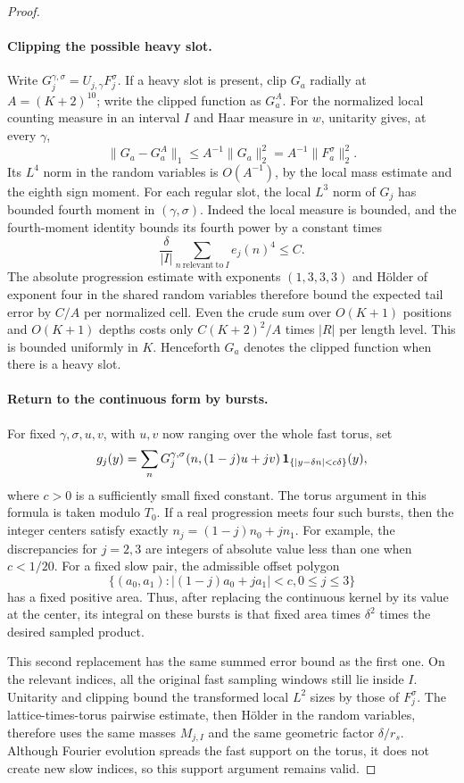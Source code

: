 \begin{proof}
\paragraph{Clipping the possible heavy slot.}
Write $G_j^{\gamma,\sigma}=U_{j,\gamma}F_j^\sigma$.
If a heavy slot is present, clip $G_a$ radially at
$A=(K+2)^{10}$; write the clipped function as $G_a^A$.
For the normalized local counting measure in an interval $I$ and
Haar measure in $w$, unitarity gives, at every $\gamma$,
\[
 \|G_a-G_a^A\|_1
 \le A^{-1}\|G_a\|_2^2
 =A^{-1}\|F_a^\sigma\|_2^2.
\]
Its $L^4$ norm in the random variables is $O(A^{-1})$, by the local
mass estimate and the eighth sign moment.  For each regular slot,
the local $L^3$ norm of $G_j$ has bounded fourth moment in
$(\gamma,\sigma)$.  Indeed the local measure is bounded, and the
fourth-moment identity bounds its fourth power by a constant times
\[
 \frac{\delta}{|I|}
       \sum_{n\ \mathrm{relevant\ to}\ I}e_j(n)^4\le C.
\]
The absolute progression estimate with exponents $(1,3,3,3)$ and
H\"older of exponent four in the shared random variables therefore
bound the expected tail error by $C/A$ per normalized cell.  Even
the crude sum over $O(K+1)$ positions and $O(K+1)$ depths costs only
$C(K+2)^2/A$ times $|R|$ per length level.  This is bounded uniformly
in $K$.  Henceforth $G_a$ denotes the clipped function when there is
a heavy slot.

\paragraph{Return to the continuous form by bursts.}
For fixed $\gamma,\sigma,u,v$, with $u,v$ now ranging over the whole
fast torus, set
\[
 g_j(y)=\sum_n G_j^{\gamma,\sigma}
                (n,(1-j)u+jv)\,
                \mathbf 1_{\{|y-\delta n|<c\delta\}}(y),
\]
where $c>0$ is a sufficiently small fixed constant.  The torus
argument in this formula is taken modulo $T_0$.  If a real progression
meets four such bursts, then the integer centers satisfy exactly
$n_j=(1-j)n_0+jn_1$.  For example, the discrepancies for $j=2,3$ are
integers of absolute value less than one when $c<1/20$.
For a fixed slow pair, the admissible offset polygon
\[
 \{(a_0,a_1): |(1-j)a_0+ja_1|<c, 0\le j\le3\}
\]
has a fixed positive area.  Thus, after replacing the continuous
kernel by its value at the center, its integral on these bursts is
that fixed area times $\delta^2$ times the desired sampled product.

This second replacement has the same summed error bound as the first
one.  On the relevant indices, all the original fast sampling windows
still lie inside $I$.  Unitarity and clipping bound the transformed
local $L^2$ sizes by those of $F_j^\sigma$.  The lattice-times-torus
pairwise estimate, then H\"older in the random variables, therefore
uses the same masses $M_{j,I}$ and the same geometric factor
$\delta/r_s$.  Although Fourier evolution spreads the fast support
on the torus, it does not create new slow indices, so this support
argument remains valid.


\end{proof}
